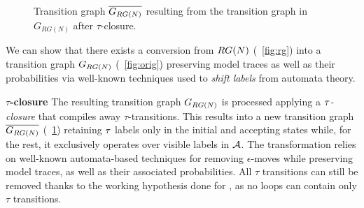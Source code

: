 \begin{figure}[!t]
\begin{minipage}{.49\textwidth}
	\caption{Transition graph $\overline{G_{RG(N)}}$ resulting from the transition graph in $G_{RG(N)}$ after $\tau$-closure.}\label{fig:closed}
\end{minipage}
\end{figure}




%
%

We can show that there exists a conversion from $RG(N)$ (\figurename~\ref{fig:rg}) into a transition graph $G_{RG(N)}$ (\figurename~\ref{fig:orig}) preserving model traces as well as their probabilities via well-known techniques used to \emph{shift labels} from automata theory.

\textbf{$\tau$-closure} The resulting transition graph $G_{RG(N)}$ is processed applying a \emph{$\tau$-closure} that compiles away
$\tau$-transitions. This results into a new transition graph $\overline{G_{RG(N)}}$ (\figurename~\ref{fig:closed}) %
retaining $\tau$ labels only in the initial and accepting states while, for the rest, it exclusively operates over visible labels in $\mathcal{A}$. %
The transformation relies on well-known automata-based techniques for removing $\epsilon$-moves while preserving model traces, as well as their associated probabilities. %
All $\tau$ transitions can still be removed thanks to the working hypothesis done for , as no loops can contain only $\tau$ transitions. %

